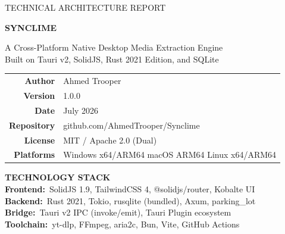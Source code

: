 \documentclass[10pt,letterpaper]{article}
\begin{document}

\begin{titlepage}
  \color{Black}
  \vspace*{3cm}
  \begin{center}
    {\fontsize{11}{14}\selectfont\sffamily\color{MidGray}\MakeUppercase{Technical Architecture Report}}
    \vspace{0.6cm}

    \noindent{\color{Black}\rule{0.5\linewidth}{1pt}}
    \vspace{0.7cm}

    {\fontsize{44}{52}\selectfont\bfseries\sffamily SYNCLIME}

    \vspace{0.5cm}
    {\fontsize{13}{17}\selectfont\color{DarkGray}
      A Cross-Platform Native Desktop Media Extraction Engine\\[3pt]
      Built on Tauri v2, SolidJS, Rust 2021 Edition, and SQLite
    }

    \vspace{0.7cm}
    \noindent{\color{Black}\rule{0.5\linewidth}{1pt}}
    \vspace{1.6cm}

    \begin{tabular}{rl}
      \color{MidGray}\textbf{Author}    & Ahmed Trooper \\[5pt]
      \color{MidGray}\textbf{Version}   & 1.0.0 \\[5pt]
      \color{MidGray}\textbf{Date}      & July 2026 \\[5pt]
      \color{MidGray}\textbf{Repository}& github.com/AhmedTrooper/Synclime \\[5pt]
      \color{MidGray}\textbf{License}   & MIT / Apache 2.0 (Dual) \\[5pt]
      \color{MidGray}\textbf{Platforms} & Windows x64/ARM64 \textbullet{} macOS ARM64 \textbullet{} Linux x64/ARM64 \\
    \end{tabular}

    \vspace{1.8cm}
    \begin{mdframed}[linecolor=Black, linewidth=0.8pt, innerleftmargin=14pt,
                    innerrightmargin=14pt, innertopmargin=10pt, innerbottommargin=10pt]
      {\centering
      \textbf{\sffamily\small TECHNOLOGY STACK}\\[6pt]
      \small
      \textbf{Frontend:}\ SolidJS 1.9, TailwindCSS 4, @solidjs/router, Kobalte UI\\[2pt]
      \textbf{Backend:}\ Rust 2021, Tokio, rusqlite (bundled), Axum, parking\_lot\\[2pt]
      \textbf{Bridge:}\ Tauri v2 IPC (invoke/emit), Tauri Plugin ecosystem\\[2pt]
      \textbf{Toolchain:}\ yt-dlp, FFmpeg, aria2c, Bun, Vite, GitHub Actions
      \par}
    \end{mdframed}


\end{center}
\end{titlepage}
\end{document}
